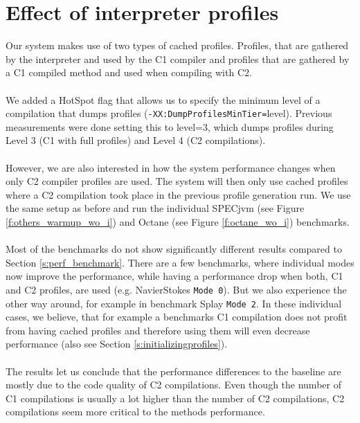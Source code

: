 \section{Effect of interpreter profiles}
\label{s:perf_interpreter_profiles}
Our system makes use of two types of cached profiles. Profiles, that are gathered by the interpreter and used by the C1 compiler and profiles that are gathered by a C1 compiled method and used when compiling with C2.
\\\\
We added a HotSpot flag that allows us to specify the minimum level of a compilation that dumps profiles (\texttt{-XX:DumpProfilesMinTier=}level).
Previous measurements were done setting this to level=3, which dumps profiles during Level 3 (C1 with full profiles) and Level 4 (C2 compilations).
\\\\
However, we are also interested in how the system performance changes when only C2 compiler profiles are used. The system will then only use cached profiles where a C2 compilation took place in the previous profile generation run. We use the same setup as before and run the individual SPECjvm (see Figure \ref{f:others_warmup_wo_i}) and Octane (see Figure \ref{f:octane_wo_i}) benchmarks. 
\\\\
Most of the benchmarks do not show significantly different results compared to Section \ref{s:perf_benchmark}. There are a few benchmarks, where individual modes now improve the performance, while having a performance drop when both, C1 and C2 profiles, are used (e.g. NavierStokes \texttt{Mode 0}). But we also experience the other way around, for example in benchmark Splay \texttt{Mode 2}. In these individual cases, we believe, that for example a benchmarks C1 compilation does not profit from having cached profiles and therefore using them will even decrease performance (also see Section \ref{s:initializingprofiles}).
\\\\
The results let us conclude that the performance differences to the baseline are mostly due to the code quality of C2 compilations. Even though the number of C1 compilations is usually a lot higher than the number of C2 compilations, C2 compilations seem more critical to the methods performance.
